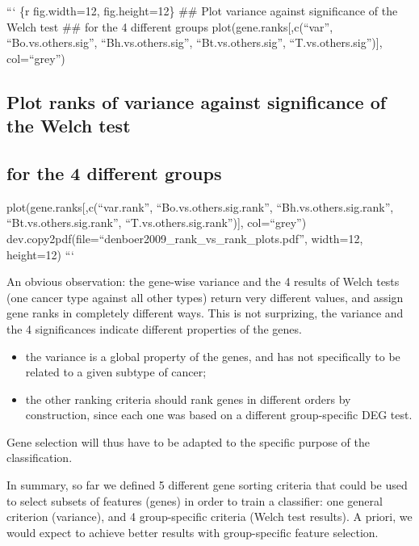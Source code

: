 ``` \{r fig.width=12, fig.height=12\} \#\# Plot variance against
significance of the Welch test \#\# for the 4 different groups
plot(gene.ranks{[},c(``var'', ``Bo.vs.others.sig'',
``Bh.vs.others.sig'', ``Bt.vs.others.sig'', ``T.vs.others.sig''){]},
col=``grey'')

\subsection{Plot ranks of variance against significance of the Welch
test}\label{plot-ranks-of-variance-against-significance-of-the-welch-test}

\subsection{for the 4 different
groups}\label{for-the-4-different-groups}

plot(gene.ranks{[},c(``var.rank'', ``Bo.vs.others.sig.rank'',
``Bh.vs.others.sig.rank'', ``Bt.vs.others.sig.rank'',
``T.vs.others.sig.rank''){]}, col=``grey'')
dev.copy2pdf(file=``denboer2009\_rank\_vs\_rank\_plots.pdf'', width=12,
height=12) ```

An obvious observation: the gene-wise variance and the 4 results of
Welch tests (one cancer type against all other types) return very
different values, and assign gene ranks in completely different ways.
This is not surprizing, the variance and the 4 significances indicate
different properties of the genes.

\begin{itemize}
\itemsep1pt\parskip0pt
\item
  the variance is a global property of the genes, and has not
  specifically to be related to a given subtype of cancer;
\item
  the other ranking criteria should rank genes in different orders by
  construction, since each one was based on a different group-specific
  DEG test.
\end{itemize}

Gene selection will thus have to be adapted to the specific purpose of
the classification.

In summary, so far we defined 5 different gene sorting criteria that
could be used to select subsets of features (genes) in order to train a
classifier: one general criterion (variance), and 4 group-specific
criteria (Welch test results). A priori, we would expect to achieve
better results with group-specific feature selection.

